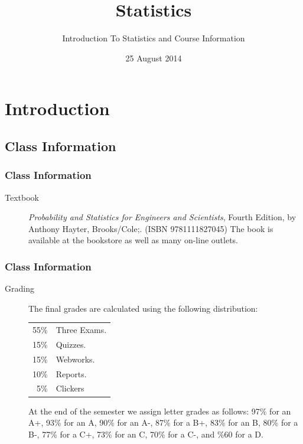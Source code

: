 
\section{Introduction}

\title{Statistics}
\subtitle{Introduction To Statistics and Course Information}

\date{25 August 2014}

\begin{frame}
  \titlepage
\end{frame}



\subsection{Class Information}


\begin{frame}
  \frametitle{Class Information}

\begin{description}
\item[Textbook] {\em Probability and Statistics for Engineers and
    Scientists}, Fourth Edition, by Anthony Hayter,
  Brooks/Cole;. (ISBN 9781111827045) The book is available at the
  bookstore as well as many on-line outlets.

\end{description}

\end{frame}


\begin{frame}
  \frametitle{Class Information}

\begin{description}
\item[Grading] %
  
  The final grades are calculated using the following distribution:
    \begin{tabular}[t]{rl}
      55\% & Three Exams. \\
      15\% & Quizzes. \\
      15\% & Webworks. \\
      10\% & Reports. \\
      5\%  & Clickers
    \end{tabular}

  
    At the end of the semester we assign letter grades as follows:
    97\% for an A+, 93\% for an A, 90\% for an A-, 
    87\% for a  B+, 83\% for an B, 80\% for a B-, 
    77\% for a  C+, 73\% for an C, 70\% for a C-, 
    and \%60 for a D.

\end{description}

\end{frame}




